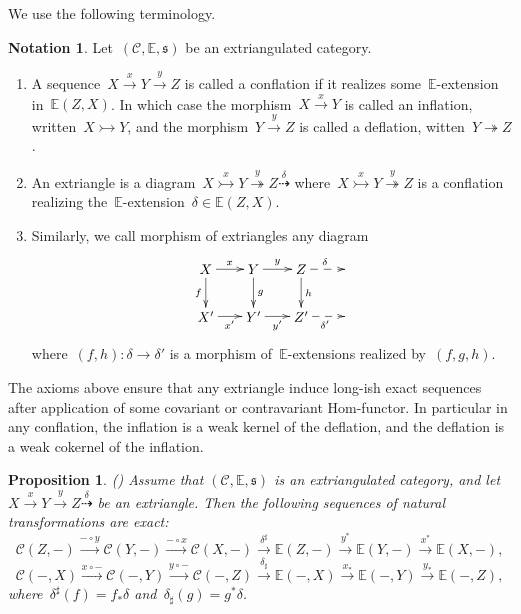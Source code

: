 \documentclass{amsart}
\newtheorem{proposition}[theorem]{Proposition}
\theoremstyle{definition}
\newtheorem{notation}[theorem]{Notation}
\newcommand{\cat}{\mathcal{C}}
\newcommand{\infl}{\rightarrowtail}
\newcommand{\defl}{\twoheadrightarrow}
\begin{document}
We use the following terminology.
\begin{notation}
Let~$(\cat,\mathbb{E},\mathfrak{s})$ be an extriangulated category.
\begin{enumerate}
\item A sequence~$X\xrightarrow{x}Y\xrightarrow{y}Z$ is called a conflation if it realizes some~$\mathbb{E}$-extension in~$\mathbb{E}(Z,X)$. In which case the morphism~$X\xrightarrow{x}Y$ is called an inflation, written~$X\infl Y$, and the morphism~$Y\xrightarrow{y}Z$ is called a deflation, witten~$Y\defl Z$.
\item An extriangle is a diagram~$X\overset{x}{\infl} Y\overset{y}{\defl} Z\overset{\delta}{\dashrightarrow}$ where~$X\overset{x}{\infl} Y\overset{y}{\defl} Z$ is a conflation realizing the~$\mathbb{E}$-extension~$\delta\in\mathbb{E}(Z,X)$.
\item Similarly, we call morphism of extriangles any diagram
\[
\xy
(-12,6)*+{X}="0";
(0,6)*+{Y}="2";
(12,6)*+{Z}="4";
(24,6)*+{}="6";
%
(-12,-6)*+{X'}="10";
(0,-6)*+{Y'}="12";
(12,-6)*+{Z'}="14";
(24,-6)*+{}="16";
%
{\ar^{x} "0";"2"};
{\ar^{y} "2";"4"};
{\ar@{-->}^{\delta} "4";"6"};
%
{\ar_{f} "0";"10"};
{\ar^{g} "2";"12"};
{\ar^{h} "4";"14"};
%
{\ar_{x'} "10";"12"};
{\ar_{y'} "12";"14"};
{\ar@{-->}_{\delta'} "14";"16"};
%
{\ar@{}|{} "0";"12"};
{\ar@{}|{} "2";"14"};
\endxy
\]
where~$(f,h):\delta\to\delta'$ is a morphism of~$\mathbb{E}$-extensions realized by~$(f,g,h)$.
\end{enumerate}
\end{notation}

The axioms above ensure that any extriangle induce long-ish exact sequences after application of some covariant or contravariant Hom-functor.
In particular in any conflation, the inflation is a weak kernel of the deflation, and the deflation is a weak cokernel of the inflation.

\begin{proposition}\emph{(}\cite[Propositions 3.3, 3.11]{NakaokaPalu}\emph{)}
Assume that $(\cat,\mathbb{E},\mathfrak{s})$ is an extriangulated category, and let $X\xrightarrow{x}Y\xrightarrow{y}Z\overset{\delta}{\dashrightarrow}$ be an extriangle.
Then the following sequences of natural transformations are exact:
\[ \cat(Z,-)\overset{-\circ y}{\longrightarrow}\cat(Y,-)\overset{-\circ x}{\longrightarrow}\cat(X,-)\overset{\delta^\sharp}{\longrightarrow}\mathbb{E}(Z,-)\overset{y^\ast}{\longrightarrow}\mathbb{E}(Y,-)\overset{x^\ast}{\longrightarrow}\mathbb{E}(X,-), \]
\[ \cat(-,X)\overset{x\circ-}{\longrightarrow}\cat(-,Y)\overset{y\circ-}{\longrightarrow}\cat(-,Z)\overset{\delta_\sharp}{\longrightarrow}\mathbb{E}(-,X)\overset{x_\ast}{\longrightarrow}\mathbb{E}(-,Y)\overset{y_\ast}{\longrightarrow}\mathbb{E}(-,Z), \]
where~$\delta^\sharp(f)=f_\ast\delta$ and~$\delta_\sharp(g)=g^\ast\delta$.
\end{proposition}
\end{document}
